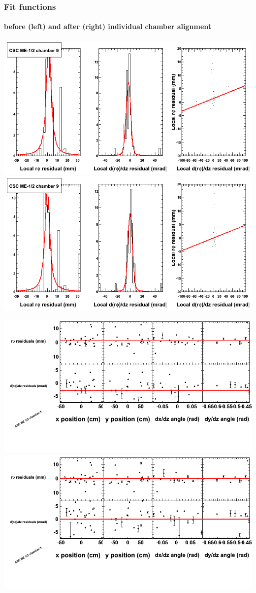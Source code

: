 \documentclass[compress]{beamer}
\begin{document}
\begin{frame}
\frametitle{Fit functions}
\framesubtitle{before (left) and after (right) individual chamber alignment}
\includegraphics[width=0.5\linewidth]{ringfits_3dof/beforefit_MEm12_09_bellcurve.png} \includegraphics[width=0.5\linewidth]{ringfits_3dof/afterfit_MEm12_09_bellcurve.png}

\includegraphics[width=0.5\linewidth]{ringfits_3dof/beforefit_MEm12_09_polynomials.png} \includegraphics[width=0.5\linewidth]{ringfits_3dof/afterfit_MEm12_09_polynomials.png}
\end{frame}
\end{document}
